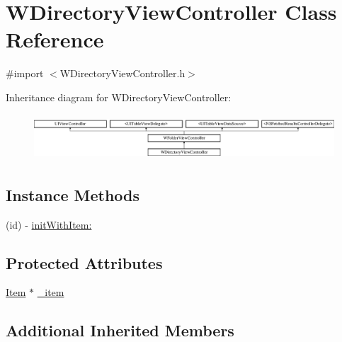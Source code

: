 \hypertarget{interface_w_directory_view_controller}{\section{W\-Directory\-View\-Controller Class Reference}
\label{interface_w_directory_view_controller}
}


{\ttfamily \#import $<$W\-Directory\-View\-Controller.\-h$>$}

Inheritance diagram for W\-Directory\-View\-Controller\-:\begin{figure}[H]
\begin{center}
\leavevmode
\includegraphics[height=1.728395cm]{interface_w_directory_view_controller}
\end{center}
\end{figure}
\subsection*{Instance Methods}
\begin{DoxyCompactItemize}
\item 
(id) -\/ \hyperlink{interface_w_directory_view_controller_af9f821543138701343ca72cd0eb322c9}{init\-With\-Item\-:}
\end{DoxyCompactItemize}
\subsection*{Protected Attributes}
\begin{DoxyCompactItemize}
\item 
\hyperlink{interface_item}{Item} $\ast$ \hyperlink{interface_w_directory_view_controller_acdfe4305ba73dc3151a5b36a768b6778}{\-\_\-item}
\end{DoxyCompactItemize}
\subsection*{Additional Inherited Members}


